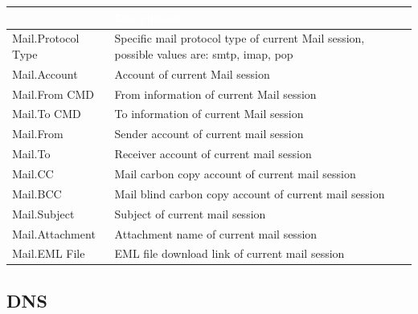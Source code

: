 \begin{longtable}{p{}|p{}}   
    \rowcolor{black}\multicolumn{1}{l!\vlinewhite}{\textcolor{white}{Field}}  & \textcolor{white}{Description} \\\hline
    Mail.Protocol Type &	Specific mail protocol type of current Mail session, possible values are: smtp, imap, pop \\\hline
    Mail.Account &	Account of current Mail session \\\hline
    Mail.From CMD &	From information of current Mail session \\\hline
    Mail.To CMD &	To information of current Mail session \\\hline
    Mail.From &	Sender account of current mail session \\\hline
    Mail.To &	Receiver account of current mail session \\\hline
    Mail.CC &	Mail carbon copy account of current mail session \\\hline
    Mail.BCC &	Mail blind carbon copy account of current mail session \\\hline
    Mail.Subject &	Subject of current mail session \\\hline
    Mail.Attachment &	Attachment name of current mail session \\\hline
    Mail.EML File &	EML file download link of current mail session    \\\hline
\end{longtable}

\subsection*{\hypertarget{link:DNS}{DNS}}
\label{sec:appendix_c:protocol:DNS}

